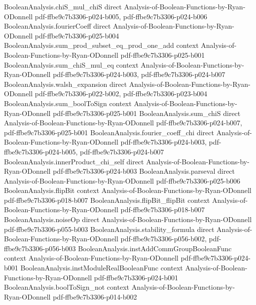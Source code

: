 \begin{lemma}
\proofstep
  {BooleanAnalysis.chiS_mul_chiS}
  {direct}
  {Analysis-of-Boolean-Functions-by-Ryan-ODonnell}
  {pdf-ffbe9c7b3306-p024-b005,
    pdf-ffbe9c7b3306-p024-b006}
\proofstep
  {BooleanAnalysis.fourierCoeff}
  {direct}
  {Analysis-of-Boolean-Functions-by-Ryan-ODonnell}
  {pdf-ffbe9c7b3306-p025-b004}
\proofstep
  {BooleanAnalysis.sum_prod_subset_eq_prod_one_add}
  {context}
  {Analysis-of-Boolean-Functions-by-Ryan-ODonnell}
  {pdf-ffbe9c7b3306-p025-b001}
\proofstep
  {BooleanAnalysis.sum_chiS_mul_eq}
  {context}
  {Analysis-of-Boolean-Functions-by-Ryan-ODonnell}
  {pdf-ffbe9c7b3306-p024-b003,
    pdf-ffbe9c7b3306-p024-b007}
\proofstep
  {BooleanAnalysis.walsh_expansion}
  {direct}
  {Analysis-of-Boolean-Functions-by-Ryan-ODonnell}
  {pdf-ffbe9c7b3306-p022-b002,
    pdf-ffbe9c7b3306-p023-b004}
\proofstep
  {BooleanAnalysis.sum_boolToSign}
  {context}
  {Analysis-of-Boolean-Functions-by-Ryan-ODonnell}
  {pdf-ffbe9c7b3306-p025-b001}
\proofstep
  {BooleanAnalysis.sum_chiS}
  {direct}
  {Analysis-of-Boolean-Functions-by-Ryan-ODonnell}
  {pdf-ffbe9c7b3306-p024-b007,
    pdf-ffbe9c7b3306-p025-b001}
\proofstep
  {BooleanAnalysis.fourier_coeff_chi}
  {direct}
  {Analysis-of-Boolean-Functions-by-Ryan-ODonnell}
  {pdf-ffbe9c7b3306-p024-b003,
    pdf-ffbe9c7b3306-p024-b005,
    pdf-ffbe9c7b3306-p024-b007}
\proofstep
  {BooleanAnalysis.innerProduct_chi_self}
  {direct}
  {Analysis-of-Boolean-Functions-by-Ryan-ODonnell}
  {pdf-ffbe9c7b3306-p024-b003}
\proofstep
  {BooleanAnalysis.parseval}
  {direct}
  {Analysis-of-Boolean-Functions-by-Ryan-ODonnell}
  {pdf-ffbe9c7b3306-p025-b006}
\proofstep
  {BooleanAnalysis.flipBit}
  {context}
  {Analysis-of-Boolean-Functions-by-Ryan-ODonnell}
  {pdf-ffbe9c7b3306-p018-b007}
\proofstep
  {BooleanAnalysis.flipBit_flipBit}
  {context}
  {Analysis-of-Boolean-Functions-by-Ryan-ODonnell}
  {pdf-ffbe9c7b3306-p018-b007}
\proofstep
  {BooleanAnalysis.noiseOp}
  {direct}
  {Analysis-of-Boolean-Functions-by-Ryan-ODonnell}
  {pdf-ffbe9c7b3306-p055-b003}
\proofstep
  {BooleanAnalysis.stability_formula}
  {direct}
  {Analysis-of-Boolean-Functions-by-Ryan-ODonnell}
  {pdf-ffbe9c7b3306-p056-b002,
    pdf-ffbe9c7b3306-p056-b003}
\proofstep
  {BooleanAnalysis.instAddCommGroupBooleanFunc}
  {context}
  {Analysis-of-Boolean-Functions-by-Ryan-ODonnell}
  {pdf-ffbe9c7b3306-p024-b001}
\proofstep
  {BooleanAnalysis.instModuleRealBooleanFunc}
  {context}
  {Analysis-of-Boolean-Functions-by-Ryan-ODonnell}
  {pdf-ffbe9c7b3306-p024-b001}
\proofstep
  {BooleanAnalysis.boolToSign_not}
  {context}
  {Analysis-of-Boolean-Functions-by-Ryan-ODonnell}
  {pdf-ffbe9c7b3306-p014-b002}

\end{lemma}
